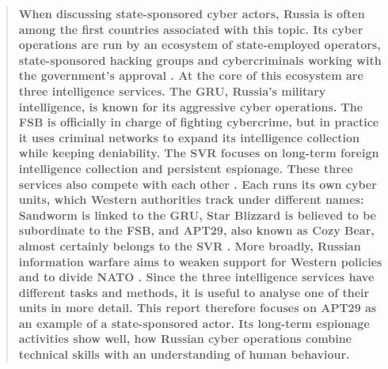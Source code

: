 \begin{abstract}
    \textbf{When discussing state-sponsored cyber actors, Russia is often among the first countries associated with this topic. Its cyber operations are run by  an ecosystem of state-employed operators, state-sponsored hacking groups and cybercriminals working with the government’s approval \parencite{olejnik2025russian}. At the core of this ecosystem are three intelligence services. The GRU, Russia’s military intelligence, is known for its aggressive cyber operations. The FSB is officially in charge of fighting cybercrime, but in practice it uses criminal networks to expand its intelligence collection while keeping deniability. The SVR focuses on long-term foreign intelligence collection and persistent espionage. These three services also compete with each other \parencite{safebreach-russia-guide}. Each runs its own cyber units, which Western authorities track under different names: Sandworm is linked to the GRU, Star Blizzard is believed to be subordinate to the FSB, and APT29, also known as Cozy Bear, almost certainly belongs to the SVR \parencite{cisa-russia-advisories}. More broadly, Russian information warfare aims to weaken support for Western policies and to divide NATO \parencite{olejnik2025russian}. Since the three intelligence services have different tasks and methods, it is useful to analyse one of their units in more detail. This report therefore focuses on APT29 as an example of a state-sponsored actor. Its long-term espionage activities show well, how Russian cyber operations combine technical skills with an understanding of human behaviour.}
\end{abstract}

